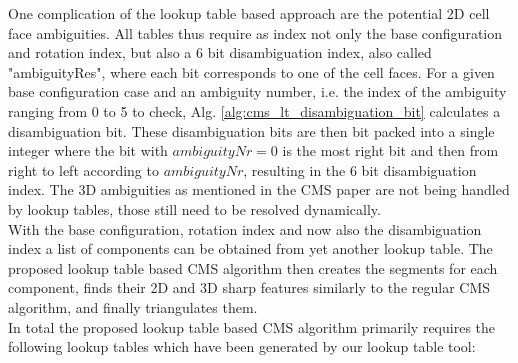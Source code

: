 One complication of the lookup table based approach are the potential 2D cell face ambiguities. All tables thus require as index not only the base configuration and rotation index, but also a $6$ bit disambiguation
index, also called "ambiguityRes", where each bit corresponds to one of the cell faces. For a given base configuration case and an ambiguity number, i.e. the index of the ambiguity ranging from 0 to 5 to check, Alg. \ref{alg:cms_lt_disambiguation_bit} calculates a disambiguation bit. These disambiguation bits are then bit packed into a single integer where the bit with $ambiguityNr = 0$ is the most right bit and then from right to left according to $ambiguityNr$, resulting
in the $6$ bit disambiguation index. The 3D ambiguities as mentioned in the CMS paper are not being handled by lookup tables, those still need to be resolved dynamically.\\
With the base configuration, rotation index and now also the disambiguation index a list of components can be obtained from yet another lookup table. The proposed lookup table based CMS algorithm then creates the segments for each
component, finds their 2D and 3D sharp features similarly to the regular CMS algorithm, and finally triangulates them.\\
In total the proposed lookup table based CMS algorithm primarily requires the following lookup tables which have been generated by our lookup table tool:
